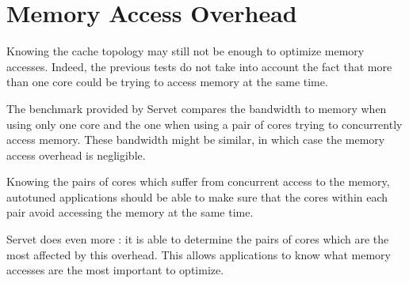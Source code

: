 \section{Memory Access Overhead}
Knowing the cache topology may still not be enough to optimize memory accesses.
Indeed, the previous tests do not take into account the fact that more than one
core could be trying to access memory at the same time.

The benchmark provided by Servet compares the bandwidth to memory when using
only one core and the one when using a pair of cores trying to concurrently
access memory. These bandwidth might be similar, in which case the memory
access overhead is negligible.

Knowing the pairs of cores which suffer from concurrent access to the memory,
autotuned applications should be able to make sure that the cores within each
pair avoid accessing the memory at the same time.

Servet does even more : it is able to determine the pairs of cores which are the
most affected by this overhead. This allows applications to know what memory
accesses are the most important to optimize.
